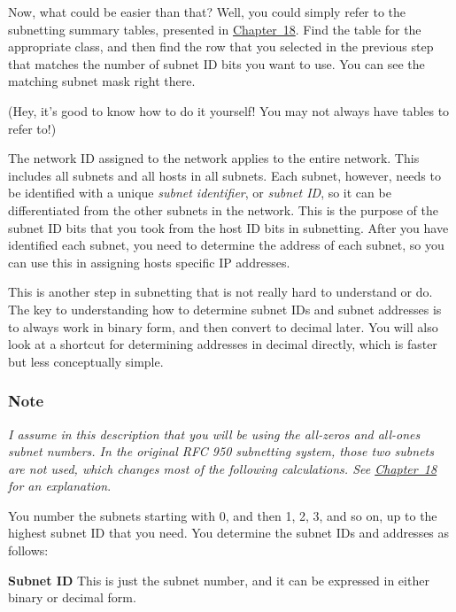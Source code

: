 Now, what could be easier than that? Well, you could simply refer to the
subnetting summary tables, presented in
\protect\hyperlink{ch18.html}{Chapter~18}. Find the table for the
appropriate class, and then find the row that you selected in the
previous step that matches the number of subnet ID bits you want to use.
You can see the matching subnet mask right there.

(Hey, it's good to know how to do it yourself! You may not always have
tables to refer to!)

\protect\hypertarget{ch19s04.html}{}{}

The network ID assigned to the network applies to the entire network.
This includes all subnets and all hosts in all subnets. Each subnet,
however, needs to be identified with a unique {\emph{subnet
identifier}}, or {\emph{subnet ID}}, so it can be differentiated from
the other subnets in the network. This is the purpose of the subnet ID
bits that you took from the host ID bits in subnetting. After you have
identified each subnet, you need to determine the address of each
subnet, so you can use this in assigning hosts specific IP addresses.

This is another step in subnetting that is not really hard to understand
or do. The key to understanding how to determine subnet IDs and subnet
addresses is to always work in binary form, and then convert to decimal
later. You will also look at a shortcut for determining addresses in
decimal directly, which is faster but less conceptually simple.

\subsubsection[Note]{\texorpdfstring{\protect\hypertarget{ch19s04.htmlux5cux23note-78}{}{}Note}{Note}}

{\emph{I assume in this description that you will be using the all-zeros
and all-ones subnet numbers. In the original RFC 950 subnetting system,
those two subnets are not used, which changes most of the following
calculations. See \protect\hyperlink{ch18.html}{Chapter~18} for an
explanation}}.

You number the subnets starting with 0, and then 1, 2, 3, and so on, up
to the highest subnet ID that you need. You determine the subnet IDs and
addresses as follows:

{\textbf{Subnet ID}} This is just the subnet number, and it can be
expressed in either binary or decimal form.

